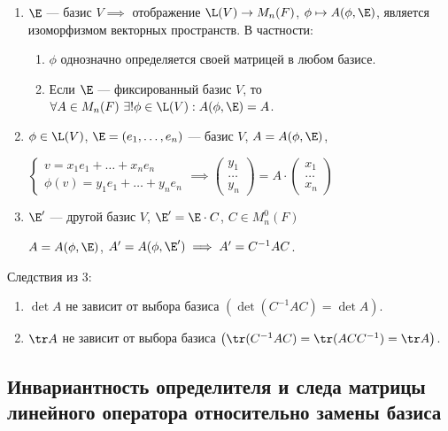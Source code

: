 \begin{enumerate}
    \item $\E$ --- базис $V \implies $ отображение $\L(V) \to M_n(F)$, $\phi \mapsto A(\phi, \E)$, является изоморфизмом векторных пространств. В частности:
        \begin{enumerate}[label=\alph*)]
        \item $\phi$ однозначно определяется своей матрицей в любом базисе.
        \item Если $\E$ --- фиксированный базис $V$, то $\forall A \in M_n(F) \ \exists! \phi \in \L(V) : A(\phi, \E) = A$.
        \end{enumerate}

    \item
        $\phi \in \L(V)$, $\E = (e_1, \dots, e_n)$ --- базис $V$, $A = A(\phi, \E)$, 

        \begin{math}
            \begin{cases}
                v = x_1 e_1 + \dots + x_n e_n \\
                \phi(v) = y_1 e_1 + \dots + y_n e_n
            \end{cases} \implies \begin{pmatrix} y_1 \\ \dots \\ y_n \end{pmatrix} = A \cdot \begin{pmatrix} x_1 \\ \dots \\ x_n \end{pmatrix}
        \end{math}

    \item $\E'$ --- другой базис $V$, $\E' = \E \cdot C$, $C \in M_n^{0}(F)$

        $A = A(\phi, \E)$, $A' = A(\phi, \E') \implies A' = C^{-1} A C$.
\end{enumerate}

Следствия из 3:
\begin{enumerate}[label=\alph*)]
    \item $\det A$ не зависит от выбора базиса $\left(\det (C^{-1} A C) = \det A\right)$.
    \item $\tr A$ не зависит от выбора базиса $\left(\tr (C^{-1} A C) = \tr (ACC^{-1}) = \tr A\right)$.
\end{enumerate}


\subsection{Инвариантность определителя и следа матрицы линейного оператора относительно замены базиса}

